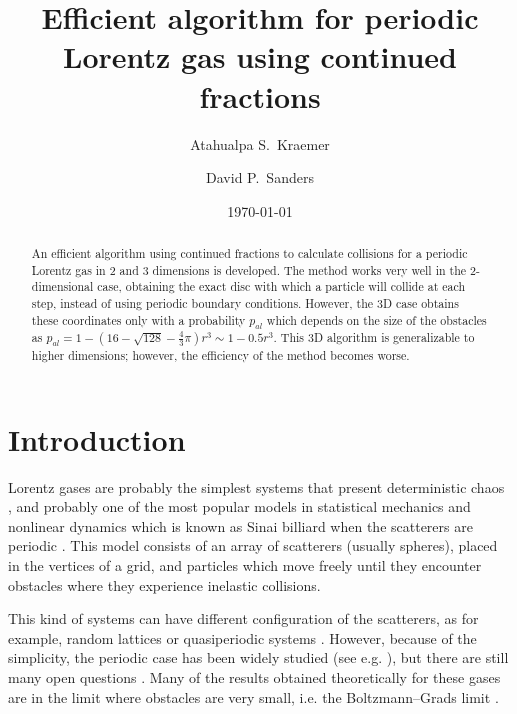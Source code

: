 \documentclass[prl,amsmath,amssymb, twocolumn, showpacs]{revtex4-1}
\newcommand{\pp}{p_{al}}
\begin{document}
\title{Efficient algorithm for periodic Lorentz gas using continued fractions}
\author{Atahualpa S.~Kraemer}
\author{David P.~Sanders}

\date{\today}
\begin{abstract}

An efficient algorithm using continued fractions to calculate collisions for a periodic Lorentz gas in 2 and 3 dimensions is developed. The method works very well in the 2-dimensional case, obtaining the exact disc with which a particle will collide at each step, instead of using periodic boundary conditions. However, the 3D case obtains these coordinates only with a probability $\pp$ which depends on the size of the obstacles as $\pp= 1-(16-\sqrt{128}-\frac{4}{3} \pi) r^3 \sim 1-0.5 r^3$. This 3D algorithm is generalizable to higher dimensions; however, the efficiency of the method becomes worse. 
\end{abstract}

\maketitle

\section{Introduction}



Lorentz gases are probably the simplest systems that present deterministic chaos \cite{cvitanovic1992investigation}, and probably one of the most popular models in statistical mechanics and nonlinear dynamics which is known as Sinai billiard when the scatterers are periodic \cite{bunimovich1981statistical}. This model consists of an array of scatterers (usually spheres), placed in the vertices of a grid, and particles which move freely until they encounter obstacles where they experience inelastic collisions. 

This kind of systems can have different configuration of the scatterers, as for example, random lattices \cite{latz1997lyapunov,dellago1997lyapunov, van1998chaotic} or quasiperiodic systems \cite{kraemer2013embedding,wennberg2012free}. However, because of the simplicity, the periodic case has been widely studied (see e.g. \cite{bunimovich1981statistical,bleher1992statistical, chernov1994statistical, gilbert2011diffusive}), but there are still many open questions \cite{gilbert2009persistence,marklof2011periodic,nandori2012tail, dettmann2012new}. Many of the results obtained theoretically for these gases are in the limit where obstacles are very small, i.e. the Boltzmann--Grads limit \cite{caglioti2003distribution, golse2012recent,boca2007distribution,golse2006periodic,caglioti2008boltzmann,caglioti2010boltzmann, golse2000distribution,marklof2008kinetic, bourgain1998distribution}. 
\end{document}
